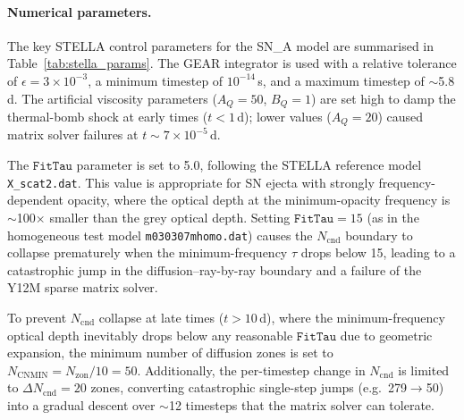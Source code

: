 \documentclass[11pt, a4paper]{article}
\newcommand{\Ncnd}{\ensuremath{N_{\mathrm{cnd}}}}
\newcommand{\FitTau}{\ensuremath{\mathtt{FitTau}}}
\newcommand{\NCNMIN}{\ensuremath{N_{\mathrm{CNMIN}}}}
\begin{document}
\paragraph{Numerical parameters.}
The key STELLA control parameters for the SN\_A model are summarised in
Table~\ref{tab:stella_params}.  The GEAR integrator \citep{Gear1971,
ByrneHindmarsh1975} is used with a relative tolerance of
$\epsilon = 3 \times 10^{-3}$, a minimum timestep of $10^{-14}$\,s, and a
maximum timestep of $\sim$5.8\,d.  The artificial viscosity parameters
($A_Q = 50$, $B_Q = 1$) are set high to damp the thermal-bomb shock at
early times ($t < 1$\,d); lower values ($A_Q = 20$) caused matrix solver
failures at $t \sim 7 \times 10^{-5}$\,d.

The $\FitTau$ parameter is set to 5.0, following the STELLA reference
model \texttt{X\_scat2.dat}.  This value is appropriate for SN ejecta with
strongly frequency-dependent opacity, where the optical depth at the
minimum-opacity frequency is $\sim$100$\times$ smaller than the grey
optical depth.  Setting $\FitTau = 15$ (as in the homogeneous test model
\texttt{m030307mhomo.dat}) causes the $\Ncnd$ boundary to collapse
prematurely when the minimum-frequency $\tau$ drops below 15, leading to a
catastrophic jump in the diffusion--ray-by-ray boundary and a failure of
the Y12M sparse matrix solver.

To prevent $\Ncnd$ collapse at late times ($t > 10$\,d), where the
minimum-frequency optical depth inevitably drops below any reasonable
$\FitTau$ due to geometric expansion, the minimum number of diffusion
zones is set to $\NCNMIN = N_{\mathrm{zon}} / 10 = 50$.  Additionally, the
per-timestep change in $\Ncnd$ is limited to $\Delta N_{\mathrm{cnd}} = 20$
zones, converting catastrophic single-step jumps (e.g.\ 279$\to$50) into a
gradual descent over $\sim$12 timesteps that the matrix solver can
tolerate.
\end{document}
